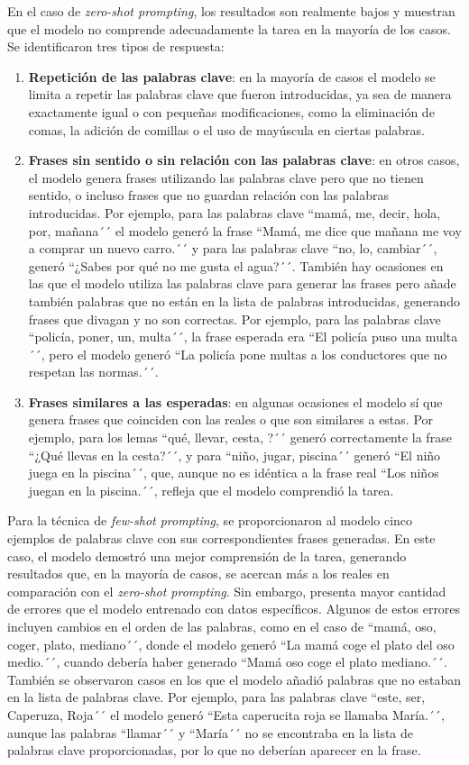 \documentclass[11pt,spanish,listoffigures,listoftables]{tfgetsinf}
\begin{document}
En el caso de \textit{zero-shot prompting}, los resultados son realmente bajos y muestran que el modelo no comprende adecuadamente la tarea en la mayoría de los casos. Se identificaron tres tipos de respuesta:

\begin{enumerate}
	\item \textbf{Repetición de las palabras clave}: en la mayoría de casos el modelo se limita a repetir las palabras clave que fueron introducidas, ya sea de manera exactamente igual o con pequeñas modificaciones, como la eliminación de comas, la adición de comillas o el uso de mayúscula en ciertas palabras.
	\item \textbf{Frases sin sentido o sin relación con las palabras clave}: en otros casos, el modelo genera frases utilizando las palabras clave pero que no tienen sentido, o incluso frases que no guardan relación con las palabras introducidas. Por ejemplo, para las palabras clave ``mamá, me, decir, hola, por, mañana´´ el modelo generó la frase ``Mamá, me dice que mañana me voy a comprar un nuevo carro.´´ y para las palabras clave ``no, lo, cambiar´´, generó ``¿Sabes por qué no me gusta el agua?´´.  También hay ocasiones en las que el modelo utiliza las palabras clave para generar las frases pero añade también palabras que no están en la lista de palabras introducidas, generando frases que divagan y no son correctas. Por ejemplo, para las palabras clave ``policía, poner, un, multa´´, la frase esperada era ``El policía puso una multa´´, pero el modelo generó ``La policía pone multas a los conductores que no respetan las normas.´´.
	\item \textbf{Frases similares a las esperadas}: en algunas ocasiones el modelo sí que genera frases que coinciden con las reales o que son similares a estas. Por ejemplo, para los lemas ``qué, llevar, cesta, ?´´ generó correctamente la frase ``¿Qué llevas en la cesta?´´, y para  ``niño, jugar, piscina´´ generó ``El niño juega en la piscina´´, que, aunque no es idéntica a la frase real ``Los niños juegan en la piscina.´´, refleja que el modelo comprendió la tarea.
\end{enumerate}

Para la técnica de \textit{few-shot prompting}, se proporcionaron al modelo cinco ejemplos de palabras clave con sus correspondientes frases generadas. En este caso, el modelo demostró una mejor comprensión de la tarea, generando resultados que, en la mayoría de casos, se acercan más a los reales en comparación con el  \textit{zero-shot prompting}. Sin embargo, presenta mayor cantidad de errores que el modelo entrenado con datos específicos. Algunos de estos errores incluyen cambios en el orden de las palabras, como en el caso de ``mamá, oso, coger, plato, mediano´´, donde el modelo generó ``La mamá coge el plato del oso medio.´´, cuando debería haber generado ``Mamá oso coge el plato mediano.´´. También se observaron casos en los que el modelo añadió palabras que no estaban en la lista de palabras clave. Por ejemplo, para las palabras clave ``este, ser, Caperuza, Roja´´ el modelo generó ``Esta caperucita roja se llamaba María.´´, aunque las palabras ``llamar´´ y ``María´´ no se encontraba en la lista de palabras clave proporcionadas, por lo que no deberían aparecer en la frase.
\end{document}
